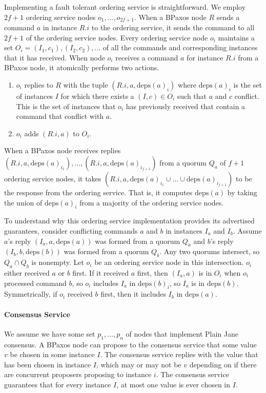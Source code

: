 \documentclass{mwhittaker}
\theoremstyle{definition}
\newcommand{\deps}[1]{\text{deps}(#1)}
\begin{document}
Implementing a fault tolerant ordering service is straightforward. We employ
$2f + 1$ ordering service nodes $o_{1}, \ldots, o_{2f + 1}$. When a BPaxos node
$R$ sends a command $a$ in instance $R.i$ to the ordering service, it sends the
command to all $2f + 1$ of the ordering service nodes. Every ordering service
node $o_i$ maintains a set $O_i = {(I_1, c_1), (I_2, c_2), \ldots}$ of all the
commands and corresponding instances that it has received. When node $o_i$
receives a command $a$ for instance $R.i$ from a BPaxos node, it atomically
performs two actions.
\begin{enumerate}
  \item
    $o_i$ replies to $R$ with the tuple $(R.i, a, \deps{a}_i)$ where
    $\deps{a}_i$ is the set of instances $I$ for which there exists a $(I, c)
    \in O_i$ such that $a$ and $c$ conflict. This is the set of instances that
    $o_i$ has previously received that contain a command that conflict with
    $a$.

  \item
    $o_i$ adds $(R.i, a)$ to $O_i$.
\end{enumerate}

When a BPaxos node receives replies $(R.i, a, \deps{a}_{i_1}), \ldots, (R.i, a,
\deps{a}_{i_{f+1}})$ from a quorum $Q_a$ of $f + 1$ ordering service nodes, it
takes $(R.i, a, \deps{a}_{i_1} \cup \ldots \cup \deps{a}_{i_{f+1}})$ to be the
response from the ordering service. That is, it computes $\deps{a}$ by taking
the union of $\deps{a}_i$ from a majority of the ordering service nodes.

To understand why this ordering service implementation provides its advertised
guarantees, consider conflicting commands $a$ and $b$ in instances $I_a$ and
$I_b$. Assume $a$'s reply $(I_a, a, \deps{a})$ was formed from a quorum $Q_a$
and $b$'s reply $(I_b, b, \deps{b})$ was formed from a quorum $Q_b$. Any two
quorums intersect, so $Q_a \cap Q_b$ is nonempty. Let $o_i$ be an ordering
service node in this intersection. $o_i$ either received $a$ or $b$ first. If
it received $a$ first, then $(I_a, a)$ is in $O_i$ when $o_i$ processed command
$b$, so $o_i$ includes $I_a$ in $\deps{b}_i$, so $I_a$ is in $\deps{b}$.
Symmetrically, if $o_i$ received $b$ first, then it includes $I_b$ in
$\deps{a}$.

\paragraph{Consensus Service}
We assume we have some set $p_1, \ldots, p_n$ of nodes that implement Plain
Jane consensus. A BPaxos node can propose to the consensus service that some
value $v$ be chosen in some instance $I$. The consensus service replies with
the value that has been chosen in instance $I$, which may or may not be $v$
depending on if there are concurrent proposers proposing to instance $i$. The
consensus service guarantees that for every instance $I$, at most one value is
ever chosen in $I$.
\end{document}
